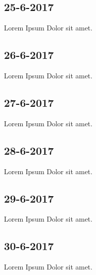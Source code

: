 \documentclass{uva-inf-article}
\begin{document}
\subsection{25-6-2017}
Lorem Ipsum Dolor sit amet.
\subsection{26-6-2017}
Lorem Ipsum Dolor sit amet.
\subsection{27-6-2017}
Lorem Ipsum Dolor sit amet.
\subsection{28-6-2017}
Lorem Ipsum Dolor sit amet.
\subsection{29-6-2017}
Lorem Ipsum Dolor sit amet.
\subsection{30-6-2017}
Lorem Ipsum Dolor sit amet.
\end{document}
